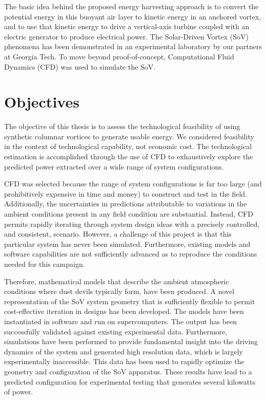 The basic idea behind the proposed energy harvesting approach is to
convert the potential energy in this buoyant air layer to kinetic energy
in an anchored vortex, and to use that kinetic energy to drive a
vertical-axis turbine coupled with an electric generator  to
produce electrical power. 
The Solar-Driven Vortex (SoV) phenomena has been demonstrated in
an experimental laboratory by our partners at Georgia
Tech\cite{mark-thesis}. To move beyond proof-of-concept, Computational
Fluid Dynamics (CFD) was used to simulate the SoV. 


\section{Objectives}

The objective of this thesis is to assess the technological feasibility
of using synthetic columnar vortices to generate usable energy. 
We considered feasibility in the context of technological capability,
not economic cost. The technological estimation is accomplished through
the use of CFD to exhaustively explore the predicted power extracted
over a wide range of system configurations. 

CFD was selected because the range of system configurations is far too
large (and prohibitively expensive in time and money) to construct and
test in the field. Additionally, the uncertainties in predictions
attributable to variations in the ambient conditions present in any field
condition are substantial. Instead, CFD permits rapidly iterating
through system design ideas with a precisely controlled, and consistent,
scenario. However, a challenge of this project is that this particular
system has never been simulated. Furthermore, existing models and
software capabilities are not sufficiently advanced as to reproduce the 
conditions needed for this campaign. 

Therefore, mathematical models that describe the ambient atmospheric 
conditions where dust devils typically form, have been produced. A novel 
representation of the SoV system geometry that is sufficiently flexible
to permit cost-effective iteration in designs has been developed. The
models have been instantiated in software and run on supercomputers. 
The output has been successfully validated against existing experimental
data. Furthermore, simulations have been performed to provide
fundamental insight into the driving dynamics of the system and
generated high resolution data, which is largely experimentally
inaccessible. This data has been used to rapidly optimize the geometry
and configuration of the SoV apparatus. These results have lead to a 
predicted configuration for experimental testing that generates several
kilowatts of power. 

